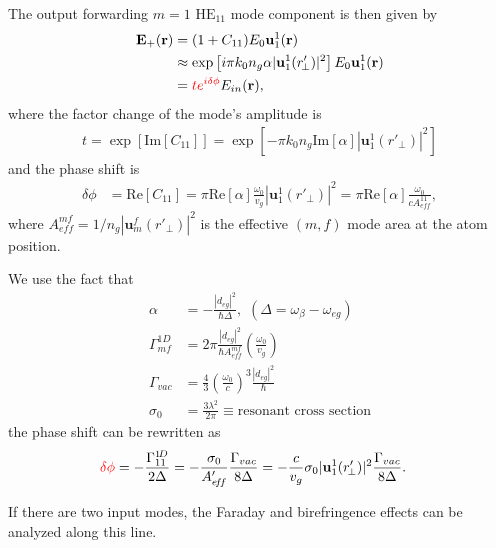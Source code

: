 \documentclass[preprint,aps,pra,onecolumn]{revtex4-1} %
\begin{document}
The output forwarding $ m=1 $ $\mathrm{HE}_{11}$ mode component is then given by
\begin{align}
\mathbf{E}_+(\mathbf{r}) &= (1+C_{11})E_0\mathbf{u}_{1}^{1} (\mathbf{r})\\
&\approx \exp\left[i\pi k_0 n_g\alpha  | \mathbf{u}_1^1(r'_{\!\perp})|^2 \right] E_0\mathbf{u}_{1}^{1} (\mathbf{r})\\
&= \mathbin{\color{red}{te^{i\delta\phi}}}E_{in}(\mathbf{r}), 
\end{align}
where the factor change of the mode's amplitude is 
\begin{align}
t=\exp\left[\mathrm{Im}[C_{11}]\right]=\exp\left[ -\pi k_0 n_g \mathrm{Im}[\alpha]  | \mathbf{u}_1^1(r'_{\!\perp})|^2 \right]
\end{align}
and the phase shift is
\begin{align}
\delta\phi &= \mathrm{Re}[C_{11}]= \pi \mathrm{Re}[\alpha] \frac{\omega_0}{v_g}  | \mathbf{u}_1^1(r'_{\!\perp})|^2
= \pi \mathrm{Re}[\alpha] \frac{\omega_0}{cA^{11}_{e\!f\!f}},
\end{align}
where $ A^{mf}_{e\!f\!f}=1/n_g| \mathbf{u}_m^f(r'_{\!\perp})|^2 $ is the effective $(m,f)$ mode area at the atom position. 

We use the fact that 
\begin{align}
\alpha &=-\frac{|d_{eg}|^2}{\hbar \Delta}, \,\, (\Delta=\omega_{\beta}-\omega_{eg})\\
\Gamma^{1D}_{mf} &= 2\pi \frac{|d_{eg}|^2}{\hbar A^{mf}_{e\!f\!f}}\left(\frac{\omega_0}{v_g} \right)\\
\Gamma_{vac} &= \frac{4}{3} \left( \frac{\omega_0}{c}\right)^3 \frac{|d_{eg}|^2}{\hbar}\\
\sigma_0 &= \frac{3\lambda^2}{2\pi} \equiv \text{resonant cross section}
\end{align}
the phase shift can be rewritten as
\begin{align}
\mathbin{\color{red}{\delta\phi}} &= -\frac{\Gamma^{1\!D}_{11}}{2\Delta} = - \frac{\sigma_0 }{A'_{e\!f\!f}} \frac{\Gamma_{vac}}{8\Delta} = -\frac{c}{v_g} \sigma_0 |\mathbf{u}_1^1 (r'_{\!\perp})|^2 \frac{\Gamma_{vac}}{8\Delta}.
\end{align}

If there are two input modes, the Faraday and birefringence effects can be analyzed along this line. 
\end{document}
